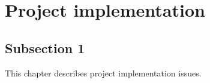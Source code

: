 \section{Project implementation}
\subsection{Subsection 1}

This chapter describes project implementation issues. 